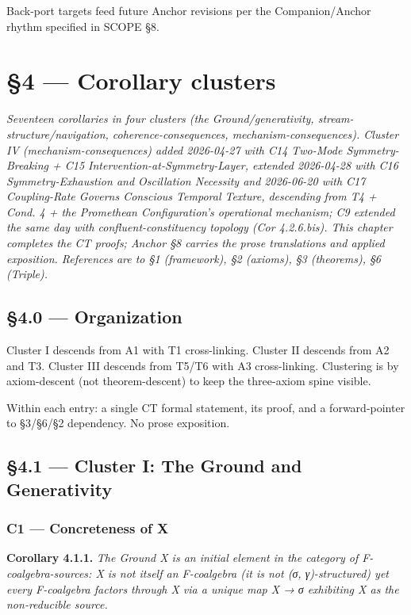 \documentclass[11pt, openany]{book}
\newcommand{\sectionbreak}{\clearpage}
\begin{document}
Back-port targets feed future Anchor revisions per the Companion/Anchor rhythm specified in SCOPE §8.

\sectionbreak


\chapter{§4 — Corollary clusters}


\textit{Seventeen corollaries in four clusters (the Ground/generativity, stream-structure/navigation, coherence-consequences, mechanism-consequences). Cluster IV (mechanism-consequences) added 2026-04-27 with C14 Two-Mode Symmetry-Breaking + C15 Intervention-at-Symmetry-Layer, extended 2026-04-28 with C16 Symmetry-Exhaustion and Oscillation Necessity and 2026-06-20 with C17 Coupling-Rate Governs Conscious Temporal Texture, descending from T4 + Cond. 4 + the Promethean Configuration's operational mechanism; C9 extended the same day with confluent-constituency topology (Cor 4.2.6.bis). This chapter completes the CT proofs; Anchor §8 carries the prose translations and applied exposition. References are to §1 (framework), §2 (axioms), §3 (theorems), §6 (Triple).}

\sectionbreak

\section{§4.0 --- Organization}

Cluster I descends from A1 with T1 cross-linking. Cluster II descends from A2 and T3. Cluster III descends from T5/T6 with A3 cross-linking. Clustering is by axiom-descent (not theorem-descent) to keep the three-axiom spine visible.

Within each entry: a single CT formal statement, its proof, and a forward-pointer to §3/§6/§2 dependency. No prose exposition.

\sectionbreak

\section{§4.1 --- Cluster I: The Ground and Generativity}

\subsection{C1 --- Concreteness of X}

\textbf{Corollary 4.1.1.} \textit{The Ground X is an initial element in the category of F-coalgebra-sources: X is not itself an F-coalgebra (it is not (σ, γ)-structured) yet every F-coalgebra factors through X via a unique map X → σ exhibiting X as the non-reducible source.}
\end{document}
